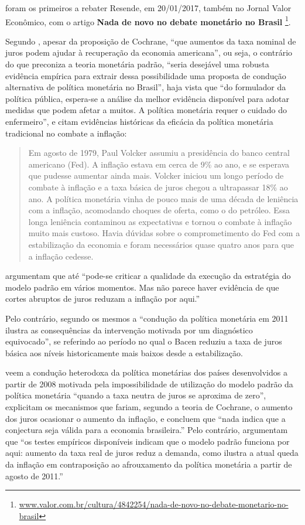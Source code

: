 \documentclass[]{article}
\let\rmarkdownfootnote\footnote%
\def\footnote{\protect\rmarkdownfootnote}
\begin{document}
 foram os primeiros a rebater Resende, em
20/01/2017, também no Jornal Valor Econômico, com o artigo \textbf{Nada
de novo no debate monetário no Brasil} \cite{lisboapessoa} \footnote{\href{http://www.valor.com.br/cultura/4842254/nada-de-novo-no-debate-monetario-no-brasil}{www.valor.com.br/cultura/4842254/nada-de-novo-no-debate-monetario-no-brasil}}.

Segundo , apesar da proposição de
Cochrane, ``que aumentos da taxa nominal de juros podem ajudar à
recuperação da economia americana'', ou seja, o contrário do que
preconiza a teoria monetária padrão, ``seria desejável uma robusta
evidência empírica para extrair dessa possibilidade uma proposta de
condução alternativa de política monetária no Brasil'', haja vista que
``do formulador da política pública, espera-se a análise da melhor
evidência disponível para adotar medidas que podem afetar a muitos. A
política monetária requer o cuidado do enfermeiro'', e citam evidências
históricas da eficácia da política monetária tradicional no combate a
inflação:

\begin{quote}
Em agosto de 1979, Paul Volcker assumiu a presidência do banco central
americano (Fed). A inflação estava em cerca de 9\% ao ano, e se esperava
que pudesse aumentar ainda mais. Volcker iniciou um longo período de
combate à inflação e a taxa básica de juros chegou a ultrapassar 18\% ao
ano. A política monetária vinha de pouco mais de uma década de leniência
com a inflação, acomodando choques de oferta, como o do petróleo. Essa
longa leniência contaminou as expectativas e tornou o combate à inflação
muito mais custoso. Havia dúvidas sobre o comprometimento do Fed com a
estabilização da economia e foram necessários quase quatro anos para que
a inflação cedesse.
\end{quote}

 argumentam que até ``pode-se criticar a
qualidade da execução da estratégia do modelo padrão em vários momentos.
Mas não parece haver evidência de que cortes abruptos de juros reduzam a
inflação por aqui.''

Pelo contrário, segundo os mesmos a ``condução da política monetária em
2011 ilustra as consequências da intervenção motivada por um diagnóstico
equivocado'', se referindo ao período no qual o Bacen reduziu a taxa de
juros básica aos níveis historicamente mais baixos desde a
estabilização.

 veem a condução heterodoxa da política
monetárias dos países desenvolvidos a partir de 2008 motivada pela
impossibilidade de utilização do modelo padrão da política monetária
``quando a taxa neutra de juros se aproxima de zero'', explicitam os
mecanismos que fariam, segundo a teoria de Cochrane, o aumento dos juros
ocasionar o aumento da inflação, e concluem que ``nada indica que a
conjectura seja válida para a economia brasileira.'' Pelo contrário,
argumentam que ``os testes empíricos disponíveis indicam que o modelo
padrão funciona por aqui: aumento da taxa real de juros reduz a demanda,
como ilustra a atual queda da inflação em contraposição ao afrouxamento
da política monetária a partir de agosto de 2011.''
\end{document}
